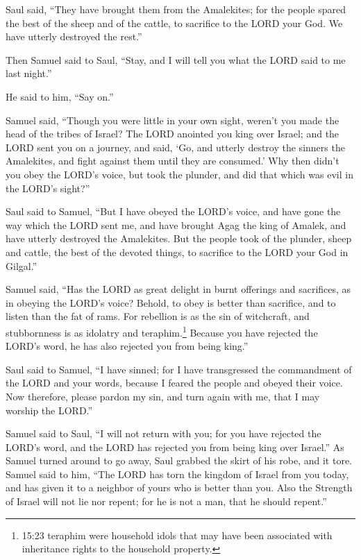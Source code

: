 \myverse{}Saul said, “They have brought them from the Amalekites; for
the people spared the best of the sheep and of the cattle, to sacrifice to the LORD your God. We have
utterly destroyed the rest.”

\myverse{}Then Samuel said to Saul, “Stay, and I will tell you what the
LORD said to me last night.”

He said to him, “Say on.”

\myverse{}Samuel said, “Though you were little in your own sight, weren’t
you made the head of the tribes of Israel? The LORD anointed you king over Israel;
\myverse{}and the LORD sent you on a journey, and said, ‘Go, and utterly destroy the
sinners the Amalekites, and fight against them until they are consumed.’
\myverse{}Why then didn’t you obey the LORD’s voice, but took the plunder, and did
that which was evil in the LORD’s sight?”

\myverse{}Saul said to Samuel, “But I have obeyed the LORD’s voice, and
have gone the way which the LORD sent me, and have brought Agag the king of Amalek, and have utterly destroyed
the Amalekites.
\myverse{}But the people took of the plunder, sheep and cattle, the best of the devoted
things, to sacrifice to the LORD your God in Gilgal.”

\myverse{}Samuel said, “Has the LORD as great delight in burnt offerings
and sacrifices, as in obeying the LORD’s voice? Behold, to obey is better than sacrifice, and to listen
than the fat of rams.
\myverse{}For rebellion is as the sin of witchcraft, and stubbornness is as idolatry
and teraphim.\footnote{15:23 teraphim were household idols that may have been associated with inheritance rights to the household
	property.} Because you have rejected the LORD’s word, he has also rejected you from being king.”

\myverse{}Saul said to Samuel, “I have sinned; for I have transgressed
the commandment of the LORD and your words, because I feared the people and obeyed their voice.
\myverse{}Now therefore, please pardon my sin, and turn again with me, that I may worship
the LORD.”

\myverse{}Samuel said to Saul, “I will not return with you; for you have
rejected the LORD’s word, and the LORD has rejected you from being king over Israel.”
\myverse{}As Samuel turned around to go away, Saul grabbed the skirt of his robe, and
it tore.
\myverse{}Samuel said to him, “The LORD has torn the kingdom of Israel from you today,
and has given it to a neighbor of yours who is better than you.
\myverse{}Also the Strength of Israel will not lie nor repent; for he is not a man,
that he should repent.”

